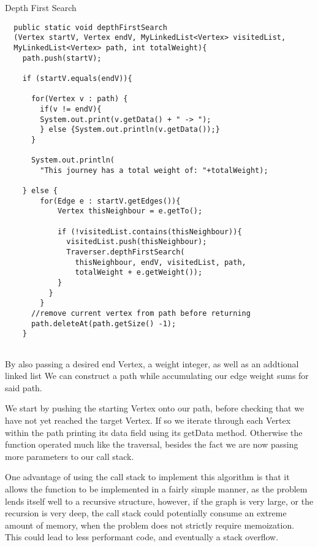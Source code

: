 \documentclass[a4paper]{article}
\begin{document}
\begin{algorithm}
\caption{Depth First Search}\label{euclid}

\begin{verbatim}
  public static void depthFirstSearch
  (Vertex startV, Vertex endV, MyLinkedList<Vertex> visitedList, 
  MyLinkedList<Vertex> path, int totalWeight){
    path.push(startV);

    if (startV.equals(endV)){

      for(Vertex v : path) {
        if(v != endV){
        System.out.print(v.getData() + " -> ");
        } else {System.out.println(v.getData());}
      }

      System.out.println(
        "This journey has a total weight of: "+totalWeight);

    } else {
        for(Edge e : startV.getEdges()){
            Vertex thisNeighbour = e.getTo();

            if (!visitedList.contains(thisNeighbour)){
              visitedList.push(thisNeighbour);
              Traverser.depthFirstSearch(
                thisNeighbour, endV, visitedList, path, 
                totalWeight + e.getWeight());
            }
          }
        }
      //remove current vertex from path before returning
      path.deleteAt(path.getSize() -1);
    }


\end{verbatim}
\end{algorithm}

By also passing a desired end Vertex, a weight integer, as well as an addtional linked list
We can construct a path while accumulating our edge weight sums for said path.

We start by pushing the starting Vertex onto our path,
before checking that we have not yet reached the target Vertex.
If so we iterate through each Vertex within the path printing its data field using its getData method.
Otherwise the function operated much like the traversal, besides the fact we are now passing more parameters 
to our call stack. 
\newpage



\vspace{10mm}
One advantage of using the call stack to implement this  algorithm is that it allows the function to be implemented in a 
fairly simple manner, as the problem lends itself well to a recursive structure,
however, if the graph is very large, or the recursion is very deep, the call stack could potentially consume an extreme amount of memory,
when the problem does not strictly require memoization.
This could lead to less performant code, and eventually a stack overflow. \\
\vspace{4mm}
\end{document}

